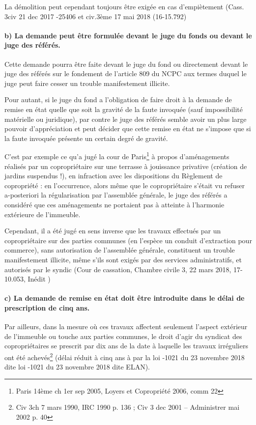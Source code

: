 				La démolition peut cependant toujours être exigée en cas d’empiètement (Cass. 3\degres civ 21 dec 2017 -25406 et civ.3ème 17 mai 2018 (16-15.792)
			
			\paragraph{b) La demande peut être formulée devant le juge du fonds ou devant le juge des référés.}
			
				Cette demande pourra être faite devant le juge du fond ou directement devant le juge des référés sur le fondement de l’article 809 du NCPC aux termes duquel le juge peut faire cesser un trouble manifestement illicite.
				
				Pour autant, si le juge du fond a l’obligation de faire droit à la demande de remise en état quelle que soit la gravité de la faute invoquée (sauf impossibilité matérielle ou juridique), par contre le juge des référés semble avoir un plus large pouvoir d’appréciation et peut décider que cette remise en état ne s’impose que si la faute invoquée présente un certain degré de gravité.
				
				C’est par exemple ce qu’a jugé la cour de Paris\footnote{Paris 14ème ch 1er sep 2005, Loyers et Copropriété 2006, comm 22} à propos d’aménagements réalisés par un copropriétaire sur une terrasse à jouissance privative (création de jardins suspendus !), en infraction avec les dispositions du Règlement de copropriété : en l’occurrence, alors même que le copropriétaire s’était vu refuser a-posteriori la régularisation par l'assemblée générale, le juge des référés a considéré que ces aménagements ne portaient pas à atteinte à l’harmonie extérieure de l’immeuble.
				
				Cependant, il a été jugé en sens inverse que les travaux effectués par un copropriétaire sur des parties communes (en l’espèce un conduit d’extraction pour commerce), sans autorisation de l’assemblée générale, constituent un trouble manifestement illicite, même s’ils sont exigés par des services administratifs, et autorisés par le syndic (Cour de cassation, Chambre civile 3, 22 mars 2018, 17-10.053, Inédit )
			
			\paragraph{c) La demande de remise en état doit être introduite dans le délai de prescription de cinq ans.}
			
				Par ailleurs, dans la mesure où ces travaux affectent seulement l’aspect extérieur de l’immeuble ou touche aux parties communes, le droit d’agir du syndicat des copropriétaires se prescrit par dix ans de la date à laquelle les travaux irréguliers ont été achevés\footnote{Civ 3\degres ch 7 mars 1990, IRC 1990 p. 136 ; Civ 3 dec 2001 – Administrer mai 2002 p. 40} (délai réduit à cinq ans à par la loi -1021 du 23 novembre 2018 dite loi -1021 du 23 novembre 2018 dite ELAN).
				
